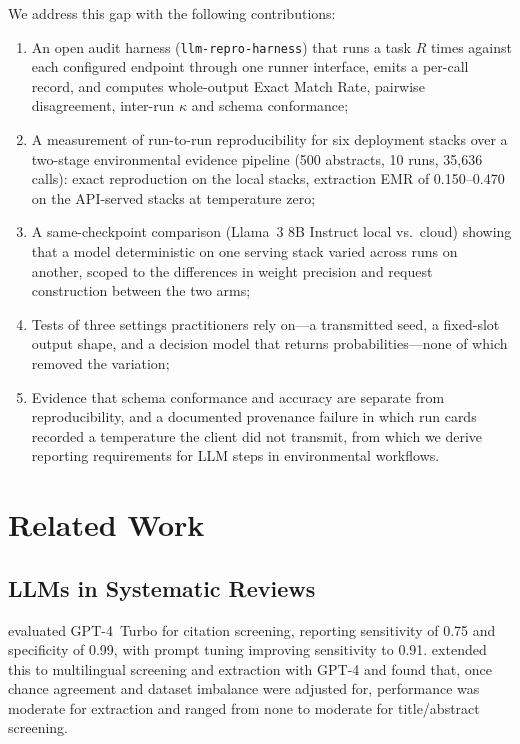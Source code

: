 \documentclass[preprint,review,12pt,authoryear]{elsarticle}
\begin{document}
We address this gap with the following contributions:
\begin{enumerate}
  \item An open audit harness (\texttt{llm-repro-harness}) that runs a task $R$ times against each configured endpoint through one runner interface, emits a per-call record, and computes whole-output Exact Match Rate, pairwise disagreement, inter-run $\kappa$ and schema conformance;
  \item A measurement of run-to-run reproducibility for six deployment stacks over a two-stage environmental evidence pipeline (500 abstracts, 10 runs, 35{,}636 calls): exact reproduction on the local stacks, extraction EMR of 0.150--0.470 on the API-served stacks at temperature zero;
  \item A same-checkpoint comparison (Llama~3 8B Instruct local vs.\ cloud) showing that a model deterministic on one serving stack varied across runs on another, scoped to the differences in weight precision and request construction between the two arms;
  \item Tests of three settings practitioners rely on---a transmitted seed, a fixed-slot output shape, and a decision model that returns probabilities---none of which removed the variation;
  \item Evidence that schema conformance and accuracy are separate from reproducibility, and a documented provenance failure in which run cards recorded a temperature the client did not transmit, from which we derive reporting requirements for LLM steps in environmental workflows.
\end{enumerate}


\section{Related Work}

\subsection{LLMs in Systematic Reviews}

\citet{oami2024screening} evaluated GPT-4~Turbo for citation screening, reporting sensitivity of 0.75 and specificity of 0.99, with prompt tuning improving sensitivity to 0.91.
\citet{khraisha2024gpt4} extended this to multilingual screening and extraction with GPT-4 and found that, once chance agreement and dataset imbalance were adjusted for, performance was moderate for extraction and ranged from none to moderate for title/abstract screening.
\end{document}
